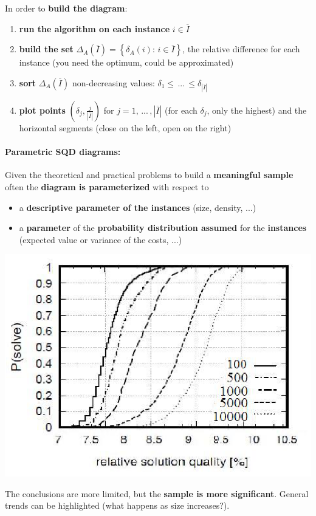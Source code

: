 \documentclass[11pt]{article}
\begin{document}
	In order to \textbf{build the diagram}:
	\begin{enumerate}
		\item \textbf{run the algorithm on each instance} $i \in \overline{I}$
		\item \textbf{build the set} $\Delta_A (\overline{I}) = \left\{\delta_A (i): \, i \in \overline{I} \right\}$, the relative difference for each instance (you need the optimum, could be approximated)
		\item \textbf{sort} $\Delta_A (\overline{I})$ non-decreasing values: $\delta_1 \leq \, ... \, \leq \delta_{|\overline{I}|}$
		\item \textbf{plot points} $\left(\delta_j, \frac{j}{|\overline{I}|}\right)$ for $j = 1, \, ... \, , |\overline{I}|$ (for each $\delta_j$, only the highest) and the horizontal segments (close on the left, open on the right)
	\end{enumerate}

	\newpage
	
	\paragraph{Parametric SQD diagrams:} Given the theoretical and practical problems to build a \textbf{meaningful sample} often the \textbf{diagram is parameterized} with respect to
	\begin{itemize}
		\item a \textbf{descriptive parameter of the instances} (size, density, ...)
		\item a \textbf{parameter} of the \textbf{probability distribution assumed} for the \textbf{instances} (expected value or variance of the costs, ...)
	\end{itemize}
	\begin{center}
		\includegraphics[width=0.7\columnwidth]{img/SQD3}
	\end{center}
	The conclusions are more limited, but the \textbf{sample is more significant}. General trends can be highlighted (what happens as size increases?).\\
	
\end{document}
